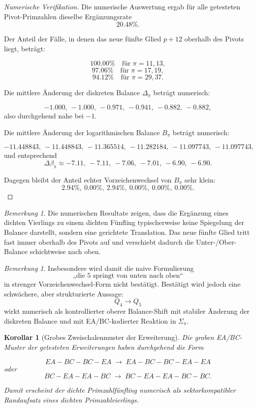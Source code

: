 \documentclass[11pt,a4paper]{article}
\newtheorem{korollar}[satz]{Korollar}
\theoremstyle{definition}
\theoremstyle{remark}
\newtheorem{bemerkung}[satz]{Bemerkung}
\begin{document}
	\begin{proof}[Numerische Verifikation]
		Die numerische Auswertung ergab für alle getesteten Pivot-Primzahlen dieselbe
		Ergänzungsrate
		\[
		20.48\%.
		\]
		
		Der Anteil der Fälle, in denen das neue fünfte Glied \(p+12\) oberhalb des Pivots liegt,
		beträgt:
		
		\[
		100.00\%\quad\text{für }\pi=11,13,
		\]
		\[
		97.06\%\quad\text{für }\pi=17,19,
		\]
		\[
		94.12\%\quad\text{für }\pi=29,37.
		\]
		
		Die mittlere Änderung der diskreten Balance \(\Delta_\pi\) beträgt numerisch:
		
		\[
		-1.000,\ -1.000,\ -0.971,\ -0.941,\ -0.882,\ -0.882,
		\]
		also durchgehend nahe bei \(-1\).
		
		Die mittlere Änderung der logarithmischen Balance \(B_\pi\) beträgt numerisch:
		
		\[
		-11.448843,\ -11.448843,\ -11.365514,\ -11.282184,\ -11.097743,\ -11.097743,
		\]
		und entsprechend
		\[
		\Delta\beta_\pi\approx -7.11,\ -7.11,\ -7.06,\ -7.01,\ -6.90,\ -6.90.
		\]
		
		Dagegen bleibt der Anteil echter Vorzeichenwechsel von \(B_\pi\) sehr klein:
		\[
		2.94\%,\ 0.00\%,\ 2.94\%,\ 0.00\%,\ 0.00\%,\ 0.00\%.
		\]
	\end{proof}
	
	\begin{bemerkung}
		Die numerischen Resultate zeigen, dass die Ergänzung eines dichten Vierlings zu einem
		dichten Fünfling typischerweise keine Spiegelung der Balance darstellt, sondern eine
		gerichtete Translation. Das neue fünfte Glied tritt fast immer oberhalb des Pivots auf
		und verschiebt dadurch die Unter-/Ober-Balance schichtweise nach oben.
	\end{bemerkung}
	
	\begin{bemerkung}
		Insbesondere wird damit die naive Formulierung
		\[
		\text{„die }5\text{ springt von unten nach oben“}
		\]
		in strenger Vorzeichenwechsel-Form nicht bestätigt. Bestätigt wird jedoch eine schwächere,
		aber strukturierte Aussage:
		\[
		Q_4\to Q_5
		\]
		wirkt numerisch als kontrollierter oberer Balance-Shift mit stabiler Änderung der
		diskreten Balance und mit EA/BC-kodierter Reaktion in \(\Sigma_\pi\).
	\end{bemerkung}
	
	\begin{korollar}[Grobes Zweischalenmuster der Erweiterung]
		\label{kor:vierling_fuenfling_grobmuster}
		Die groben EA/BC-Muster der getesteten Erweiterungen haben durchgehend die Form
		
		\[
		EA-BC-BC-EA \;\longrightarrow\; EA-BC-BC-EA-EA
		\]
		oder
		\[
		BC-EA-EA-BC \;\longrightarrow\; BC-EA-EA-BC-BC.
		\]
		
		Damit erscheint der dichte Primzahlfünfling numerisch als sektorkompatibler Randaufsatz
		eines dichten Primzahlvierlings.
	\end{korollar}
	
\end{document}

